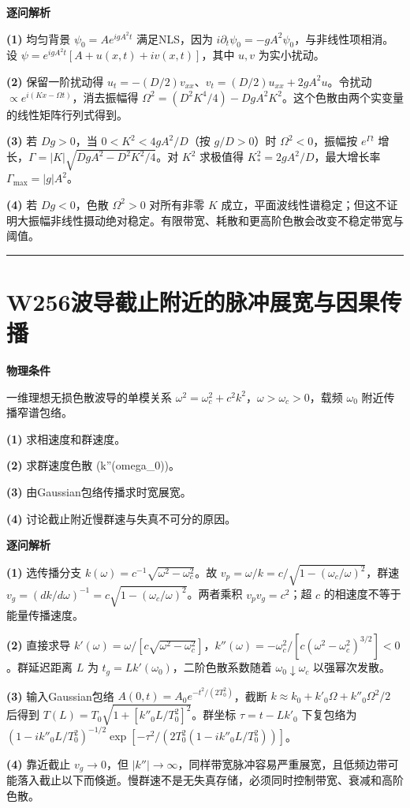 \documentclass[UTF8,a4paper,11pt,oneside,openany]{ctexbook}
\begin{document}
\par\medskip\noindent\textbf{逐问解析}
\par\noindent\textbf{(1)} 均匀背景 \(\psi_0=Ae^{igA^2t}\) 满足NLS，因为 \(i\partial_t\psi_0=-gA^2\psi_0\)，与非线性项相消。设 \(\psi=e^{igA^2t}[A+u(x,t)+iv(x,t)]\)，其中 \(u,v\) 为实小扰动。
\par\noindent\textbf{(2)} 保留一阶扰动得 \(u_t=-(D/2)v_{xx}\)、\(v_t=(D/2)u_{xx}+2gA^2u\)。令扰动 \(\propto e^{i(Kx-\Omega t)}\)，消去振幅得 \(\Omega^2=(D^2K^4/4)-DgA^2K^2\)。这个色散由两个实变量的线性矩阵行列式得到。
\par\noindent\textbf{(3)} 若 \(Dg>0\)，当 \(0<K^2<4gA^2/D\)（按 \(g/D>0\)）时 \(\Omega^2<0\)，振幅按 \(e^{\Gamma t}\) 增长，\(\Gamma=|K|\sqrt{DgA^2-D^2K^2/4}\)。对 \(K^2\) 求极值得 \(K_*^2=2gA^2/D\)，最大增长率 \(\Gamma_{\max}=|g|A^2\)。
\par\noindent\textbf{(4)} 若 \(Dg<0\)，色散 \(\Omega^2>0\) 对所有非零 \(K\) 成立，平面波线性谱稳定；但这不证明大振幅非线性摄动绝对稳定。有限带宽、耗散和更高阶色散会改变不稳定带宽与阈值。

\par\bigskip\hrule\bigskip
\section*{W256\quad 波导截止附近的脉冲展宽与因果传播}
\textbf{物理条件}\par 一维理想无损色散波导的单模关系 \(\omega^2=\omega_c^2+c^2k^2\)，\(\omega>\omega_c>0\)，载频 \(\omega_0\) 附近传播窄谱包络。
\par\noindent\textbf{(1)} 求相速度和群速度。
\par\noindent\textbf{(2)} 求群速度色散 (k''(omega\_0))。
\par\noindent\textbf{(3)} 由Gaussian包络传播求时宽展宽。
\par\noindent\textbf{(4)} 讨论截止附近慢群速与失真不可分的原因。

\par\medskip\noindent\textbf{逐问解析}
\par\noindent\textbf{(1)} 选传播分支 \(k(\omega)=c^{-1}\sqrt{\omega^2-\omega_c^2}\)。故 \(v_p=\omega/k=c/\sqrt{1-(\omega_c/\omega)^2}\)，群速 \(v_g=(dk/d\omega)^{-1}=c\sqrt{1-(\omega_c/\omega)^2}\)。两者乘积 \(v_pv_g=c^2\)；超 \(c\) 的相速度不等于能量传播速度。
\par\noindent\textbf{(2)} 直接求导 \(k'(\omega)=\omega/[c\sqrt{\omega^2-\omega_c^2}]\)，\(k''(\omega)=-\omega_c^2/[c(\omega^2-\omega_c^2)^{3/2}]<0\)。群延迟距离 \(L\) 为 \(t_g=Lk'(\omega_0)\)，二阶色散系数随着 \(\omega_0\downarrow\omega_c\) 以强幂次发散。
\par\noindent\textbf{(3)} 输入Gaussian包络 \(A(0,t)=A_0e^{-t^2/(2T_0^2)}\)，截断 \(k\approx k_0+k'_0\Omega+k''_0\Omega^2/2\) 后得到 \(T(L)=T_0\sqrt{1+[k''_0L/T_0^2]^2}\)。群坐标 \(\tau=t-Lk'_0\) 下复包络为 \((1-ik''_0L/T_0^2)^{-1/2}\exp[-\tau^2/(2T_0^2(1-ik''_0L/T_0^2))]\)。
\par\noindent\textbf{(4)} 靠近截止 \(v_g\to0\)，但 \(|k''|\to\infty\)，同样带宽脉冲容易严重展宽，且低频边带可能落入截止以下而倏逝。慢群速不是无失真存储，必须同时控制带宽、衰减和高阶色散。
\end{document}
